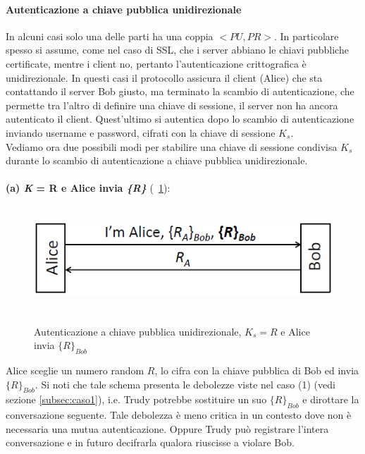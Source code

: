 \paragraph{Autenticazione a chiave pubblica unidirezionale}
In alcuni casi solo una delle parti ha una coppia $<PU, PR>$. In particolare spesso si assume, come nel caso di SSL, che i server abbiano le chiavi pubbliche certificate, mentre i client no, pertanto l'autenticazione crittografica è unidirezionale. In questi casi il protocollo assicura il client (Alice) che sta contattando il server Bob giusto, ma terminato la scambio di autenticazione, che permette tra l'altro di definire una chiave di sessione, il server non ha ancora autenticato il client. Quest'ultimo si autentica dopo lo scambio di autenticazione inviando username e password, cifrati con la chiave di sessione $K_{s}$.\\ 
Vediamo ora due possibili modi per stabilire una chiave di sessione condivisa $K_{s}$ durante lo scambio di autenticazione a chiave pubblica unidirezionale.\\ \\
\textbf{(a) \textit{K} = R e Alice invia \textit{\{R\}}} (\figurename~\ref{fig:ImgS81bis}): 
\begin{figure}[htbp]
	\centering%
	\subfigure%
	{\includegraphics[height=4cm, width=12cm, keepaspectratio]{Immagini/autenticazione/ImgS81bis.png}}
	\caption{Autenticazione a chiave pubblica unidirezionale, $K_{s} = R$ e Alice invia $\lbrace R\rbrace_{Bob}$}\label{fig:ImgS81bis} 	
\end{figure}
Alice sceglie un numero random $R$, lo cifra con la chiave pubblica di Bob ed invia $\lbrace R\rbrace_{Bob}$. Si noti che tale schema presenta le debolezze viste nel caso (1) (vedi sezione \ref{subsec:caso1}), i.e. Trudy potrebbe sostituire un suo $\lbrace R\rbrace_{Bob}$ e dirottare la conversazione seguente. Tale debolezza è meno critica in un contesto dove non è necessaria una mutua autenticazione. Oppure Trudy può registrare l'intera conversazione e in futuro decifrarla qualora riuscisse a violare Bob.\\ \\
